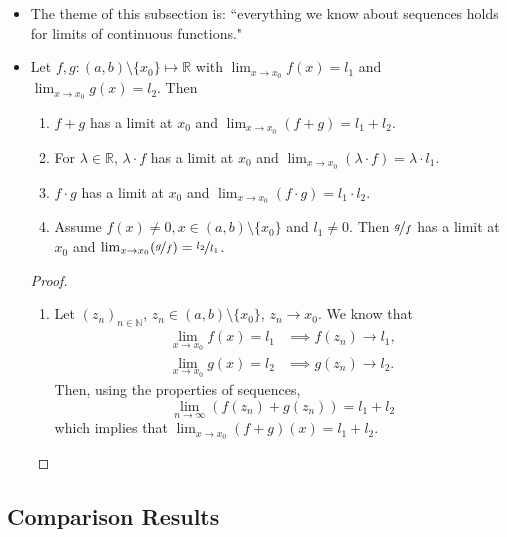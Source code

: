 \documentclass{article}
\newcommand{\R}{\mathbb{R}}
\newcommand{\N}{\mathbb{N}}
\newcommand{\seq}[2]{(#1_{#2})_{#2 \in \N}}
\newcommand{\?}{\stackrel{?}{=}}
\theoremstyle{definition} %
\begin{document}
\begin{itemize}
    \item The theme of this subsection is: ``everything we know about sequences holds for limits of continuous functions."
    \item[]
    \begin{lemma}
        Let $f, g: (a, b) \setminus\{x_0\} \mapsto \R$ with $\lim_{x \to x_0} f(x) = l_1$ and $\lim_{x \to x_0} g(x) = l_2$. Then
        \begin{enumerate}[label=(\arabic*)]
            \item $f + g$ has a limit at $x_0$ and $\lim_{x \to x_0} (f + g) = l_1 + l_2$.
            \item For $\lambda \in \R$, $\lambda \cdot f$ has a limit at $x_0$ and $\lim_{x \to x_0} (\lambda \cdot f) = \lambda \cdot l_1$.
            \item $f \cdot g$ has a limit at $x_0$ and $\lim_{x \to x_0} (f \cdot g) = l_1 \cdot l_2$.
            \item Assume $f(x) \neq 0, x \in (a, b) \setminus\{x_0\}$ and $l_1 \neq 0$. Then $\nicefrac{g}{f}$ has a limit at $x_0$ and $\lim_{x \to x_0} (\nicefrac{g}{f}) = \nicefrac{l_2}{l_1}$.
        \end{enumerate}
    \end{lemma}
    \begin{proof}
        \begin{enumerate}[label=(\arabic*)]
            \item Let $\seq{z}{n}$, $z_n \in (a, b) \setminus\{x_0\}$, $z_n \rightarrow x_0$. We know that 
            \begin{align*}
                \lim_{x \to x_0} f(x) = l_1 &\implies f(z_n) \rightarrow l_1, \\
                \lim_{x \to x_0} g(x) = l_2 &\implies g(z_n) \rightarrow l_2.
            \end{align*}
            Then, using the properties of sequences,
            $$\lim_{n \to \infty} (f(z_n) + g(z_n)) = l_1 + l_2$$
            which implies that $\lim_{x \to x_0} (f + g)(x) = l_1 + l_2$.
        \end{enumerate}
    \end{proof}
\end{itemize}

\subsection{Comparison Results}
\end{document}
